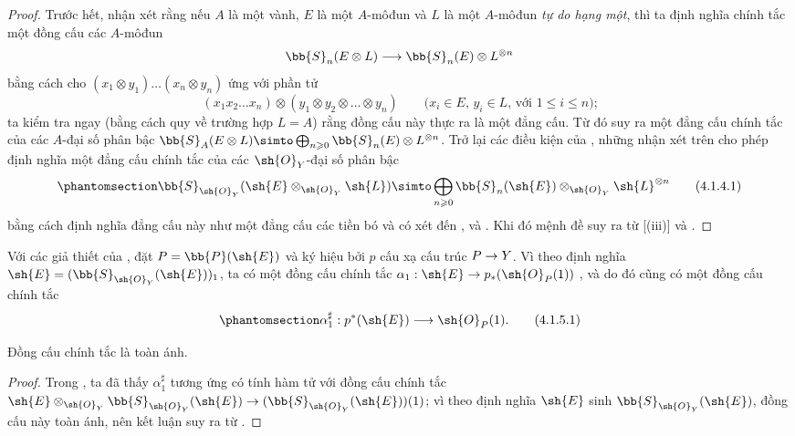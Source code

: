 \documentclass[oneside,10pt]{amsart}
\makeatletter
\renewcommand{\leq}{\leqslant}
\renewcommand{\geq}{\geqslant}
\newcommand{\ega@arrow}[2]{\mathchoice{#1}{#2}{#2}{#2}}
\renewcommand{\to}{\ega@arrow{\longrightarrow}{\rightarrow}}
\let\EGAOriginalLabel\label
\renewcommand{\label}[1]{\phantomsection\EGAOriginalLabel{#1}}
\makeatother
\begin{document}
\begin{proof}
Trước hết, nhận xét rằng nếu $A$ là một vành, $E$ là một $A$-môđun và $L$ là một $A$-môđun \emph{tự do hạng một}, thì ta định nghĩa chính tắc một đồng cấu các $A$-môđun
\[
  \bb{S}_n(E\otimes L) \to \bb{S}_n(E)\otimes L^{\otimes n}
\]
bằng cách cho $(x_1\otimes y_1)\ldots(x_n\otimes y_n)$ ứng với phần tử
\[
  (x_1x_2\ldots x_n)\otimes(y_1\otimes y_2\otimes\ldots\otimes y_n)
  \qquad\mbox{($x_i\in E$, $y_i\in L$, với $1\leq i\leq n$);}
\]
ta kiểm tra ngay (bằng cách quy về trường hợp $L=A$) rằng đồng cấu này thực ra là một đẳng cấu.
Từ đó suy ra một đẳng cấu chính tắc của các $A$-đại số phân bậc $\bb{S}_A(E\otimes L)\simto\bigoplus_{n\geq0}\bb{S}_n(E)\otimes L^{\otimes n}$.
Trở lại các điều kiện của , những nhận xét trên cho phép định nghĩa một đẳng cấu chính tắc của các $\sh{O}_Y$-đại số phân bậc
\[
\label{II.4.1.4.1}
  \bb{S}_{\sh{O}_Y}(\sh{E}\otimes_{\sh{O}_Y}\sh{L}) \simto \bigoplus_{n\geq0}\bb{S}_n(\sh{E})\otimes_{\sh{O}_Y}\sh{L}^{\otimes n}
  \tag{4.1.4.1}
\]
bằng cách định nghĩa đẳng cấu này như một đẳng cấu các tiền bó và có xét đến ,  và .
Khi đó mệnh đề suy ra từ [(iii)] và .
\end{proof}

\begin{env}[4.1.5]
\label{II.4.1.5}
Với các giả thiết của , đặt $P=\bb{P}(\sh{E})$ và ký hiệu bởi $p$ cấu xạ cấu trúc $P\to Y$.
Vì theo định nghĩa $\sh{E}=(\bb{S}_{\sh{O}_Y}(\sh{E}))_1$, ta có một đồng cấu chính tắc $\alpha_1:\sh{E}\to p_*(\sh{O}_P(1))$ , và do đó cũng có  một đồng cấu chính tắc
\[
\label{II.4.1.5.1}
  \alpha_1^\sharp: p^*(\sh{E}) \to \sh{O}_P(1).
  \tag{4.1.5.1}
\]
\end{env}

\begin{proposition}[4.1.6]
\label{II.4.1.6}
Đồng cấu chính tắc  là toàn ánh.
\end{proposition}

\begin{proof}
Trong , ta đã thấy $\alpha_1^\sharp$ tương ứng có tính hàm tử với đồng cấu chính tắc $\sh{E}\otimes_{\sh{O}_Y}\bb{S}_{\sh{O}_Y}(\sh{E})\to(\bb{S}_{\sh{O}_Y}(\sh{E}))(1)$;
vì theo định nghĩa $\sh{E}$ sinh $\bb{S}_{\sh{O}_Y}(\sh{E})$, đồng cấu này toàn ánh, nên kết luận suy ra từ .
\end{proof}
\end{document}
